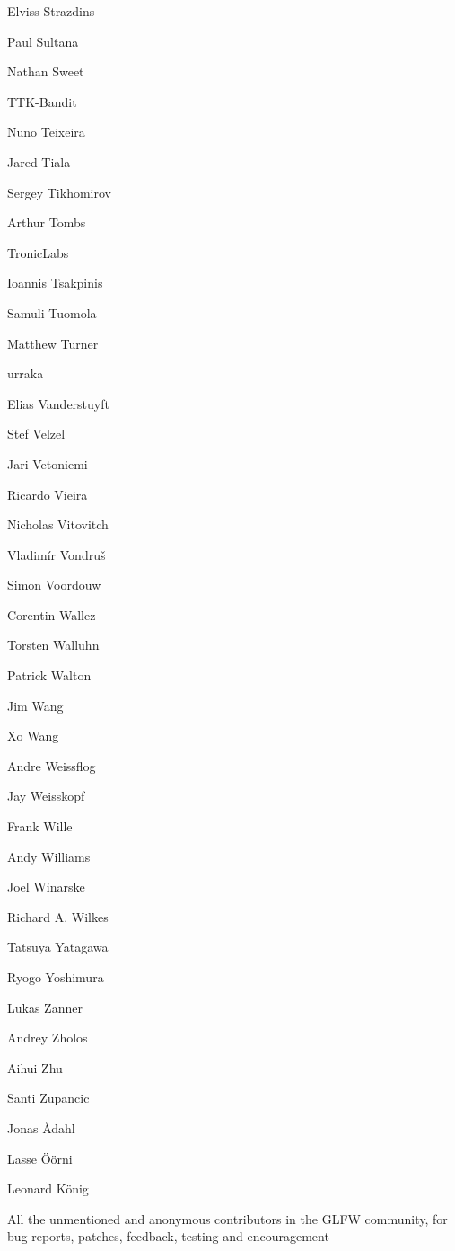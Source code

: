 \begin{DoxyItemize}
\item Elviss Strazdins
\item Paul Sultana
\item Nathan Sweet
\item TTK-\/\+Bandit
\item Nuno Teixeira
\item Jared Tiala
\item Sergey Tikhomirov
\item Arthur Tombs
\item Tronic\+Labs
\item Ioannis Tsakpinis
\item Samuli Tuomola
\item Matthew Turner
\item urraka
\item Elias Vanderstuyft
\item Stef Velzel
\item Jari Vetoniemi
\item Ricardo Vieira
\item Nicholas Vitovitch
\item Vladimír Vondruš
\item Simon Voordouw
\item Corentin Wallez
\item Torsten Walluhn
\item Patrick Walton
\item Jim Wang
\item Xo Wang
\item Andre Weissflog
\item Jay Weisskopf
\item Frank Wille
\item Andy Williams
\item Joel Winarske
\item Richard A. Wilkes
\item Tatsuya Yatagawa
\item Ryogo Yoshimura
\item Lukas Zanner
\item Andrey Zholos
\item Aihui Zhu
\item Santi Zupancic
\item Jonas Ådahl
\item Lasse Öörni
\item Leonard König
\item All the unmentioned and anonymous contributors in the GLFW community, for bug reports, patches, feedback, testing and encouragement 
\end{DoxyItemize}